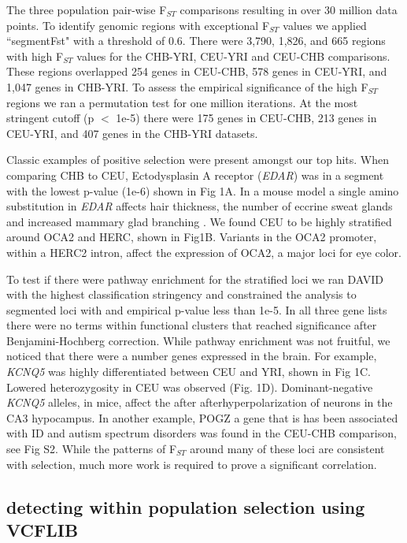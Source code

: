 \documentclass[10pt,letterpaper]{article}
\begin{document}
The three population pair-wise F$_{ST}$ comparisons resulting in over 30 million data points. To identify genomic regions with exceptional  F$_{ST}$  values we applied ``segmentFst" with a threshold of 0.6.   There were 3,790, 1,826, and 665 regions with high  F$_{ST}$  values for the CHB-YRI, CEU-YRI and CEU-CHB comparisons.  These regions overlapped 254 genes in CEU-CHB, 578 genes in CEU-YRI, and 1,047 genes in CHB-YRI.   To assess the empirical significance of the high  F$_{ST}$ regions we ran a permutation test for one million iterations.  At the most stringent cutoff (p $<$ 1e-5) there were 175 genes in CEU-CHB, 213 genes in CEU-YRI, and 407 genes in the CHB-YRI datasets.   

Classic examples of positive selection were present amongst our top hits. When comparing CHB to CEU, Ectodysplasin A receptor (\textit{EDAR}) was in a segment with the lowest p-value (1e-6) shown in Fig 1A. In a mouse model a single amino substitution in \textit{EDAR} affects hair thickness, the number of eccrine sweat glands and increased mammary glad branching \cite{edar}. We found CEU to be highly stratified around OCA2 and HERC, shown in Fig1B.  Variants in the OCA2 promoter, within a HERC2 intron, affect the expression of OCA2, a major loci for eye color\cite{oca2}.  

To test if there were  pathway enrichment for the stratified loci we ran DAVID with the highest classification stringency and constrained the analysis to segmented loci with and empirical p-value less than 1e-5. In all three gene lists there were no terms within functional clusters that reached significance after Benjamini-Hochberg correction.  While pathway enrichment was not fruitful, we noticed that there were a number genes expressed in the brain.  For example, \textit{KCNQ5} was highly differentiated between CEU and YRI, shown in Fig 1C.  Lowered heterozygosity in CEU was observed (Fig. 1D).  Dominant-negative \textit{KCNQ5} alleles, in mice, affect the after afterhyperpolarization of neurons in the CA3 hypocampus\cite{kcnq5}.  In another example, POGZ a gene that is has been associated with ID and autism spectrum disorders was found in the CEU-CHB comparison, see Fig S2.  While the patterns of F$_{ST}$ around many of these loci are consistent with selection, much more work is required to prove a significant correlation.

\subsection*{detecting within population selection using VCFLIB}
\end{document}
